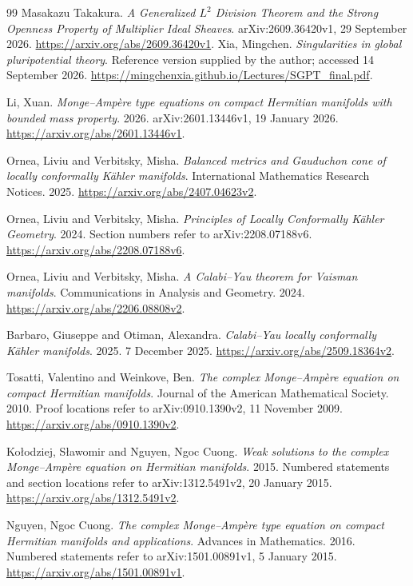 \documentclass[11pt]{article}
\begin{document}
\begin{thebibliography}{99}
 Masakazu Takakura. \emph{A Generalized $L^2$ Division Theorem and the Strong Openness Property of Multiplier Ideal Sheaves}. arXiv:2609.36420v1, 29 September 2026. \url{https://arxiv.org/abs/2609.36420v1}.
 Xia, Mingchen. \emph{Singularities in global pluripotential theory}. Reference version supplied by the author; accessed 14 September 2026. \url{https://mingchenxia.github.io/Lectures/SGPT_final.pdf}.

 Li, Xuan. \emph{{Monge--Amp\`ere} type equations on compact {Hermitian} manifolds with bounded mass property}. 2026. arXiv:2601.13446v1, 19 January 2026. \url{https://arxiv.org/abs/2601.13446v1}.

 Ornea, Liviu and Verbitsky, Misha. \emph{Balanced metrics and {Gauduchon} cone of locally conformally {K\"ahler} manifolds}. International Mathematics Research Notices. 2025. \url{https://arxiv.org/abs/2407.04623v2}.

 Ornea, Liviu and Verbitsky, Misha. \emph{Principles of Locally Conformally {K\"ahler} Geometry}. 2024. Section numbers refer to arXiv:2208.07188v6. \url{https://arxiv.org/abs/2208.07188v6}.

 Ornea, Liviu and Verbitsky, Misha. \emph{A {Calabi--Yau} theorem for {Vaisman} manifolds}. Communications in Analysis and Geometry. 2024. \url{https://arxiv.org/abs/2206.08808v2}.

 Barbaro, Giuseppe and Otiman, Alexandra. \emph{{Calabi--Yau} locally conformally {K\"ahler} manifolds}. 2025. 7 December 2025. \url{https://arxiv.org/abs/2509.18364v2}.

 Tosatti, Valentino and Weinkove, Ben. \emph{The complex {Monge--Amp\`ere} equation on compact {Hermitian} manifolds}. Journal of the American Mathematical Society. 2010. Proof locations refer to arXiv:0910.1390v2, 11 November 2009. \url{https://arxiv.org/abs/0910.1390v2}.

 Ko{\l}odziej, S{\l}awomir and Nguyen, Ngoc Cuong. \emph{Weak solutions to the complex {Monge--Amp\`ere} equation on {Hermitian} manifolds}. 2015. Numbered statements and section locations refer to arXiv:1312.5491v2, 20 January 2015. \url{https://arxiv.org/abs/1312.5491v2}.

 Nguyen, Ngoc Cuong. \emph{The complex {Monge--Amp\`ere} type equation on compact {Hermitian} manifolds and applications}. Advances in Mathematics. 2016. Numbered statements refer to arXiv:1501.00891v1, 5 January 2015. \url{https://arxiv.org/abs/1501.00891v1}.


\end{thebibliography}
\end{document}
